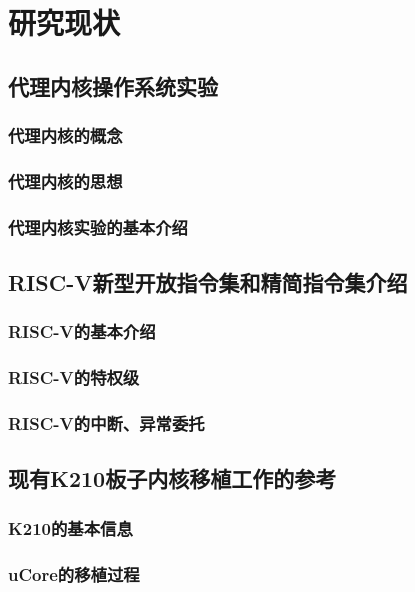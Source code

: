 %
%
%
%
%
%

\chapter{研究现状}

\section{代理内核操作系统实验}

\subsection{代理内核的概念}

\subsection{代理内核的思想}

\subsection{代理内核实验的基本介绍}

\section{RISC-V新型开放指令集和精简指令集介绍}

\subsection{RISC-V的基本介绍}

\subsection{RISC-V的特权级}

\subsection{RISC-V的中断、异常委托}

\section{现有K210板子内核移植工作的参考}

\subsection{K210的基本信息}

\subsection{uCore的移植过程}


